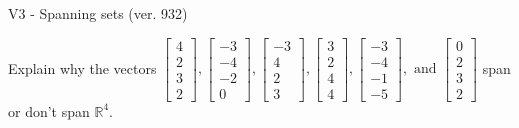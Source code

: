 \begin{exercise}
  \begin{exerciseTitle}V3 - Spanning sets (ver. 932)\end{exerciseTitle}
  \begin{exerciseStatement}
    Explain why the vectors \(\left[\begin{array}{r}
4 \\
2 \\
3 \\
2
\end{array}\right] , \left[\begin{array}{r}
-3 \\
-4 \\
-2 \\
0
\end{array}\right] , \left[\begin{array}{r}
-3 \\
4 \\
2 \\
3
\end{array}\right] , \left[\begin{array}{r}
3 \\
2 \\
4 \\
4
\end{array}\right] , \left[\begin{array}{r}
-3 \\
-4 \\
-1 \\
-5
\end{array}\right] , \text{ and } \left[\begin{array}{r}
0 \\
2 \\
3 \\
2
\end{array}\right]\) span or don't span \(\mathbb{R}^4\). 
	



\end{exerciseStatement}
\end{exercise}
